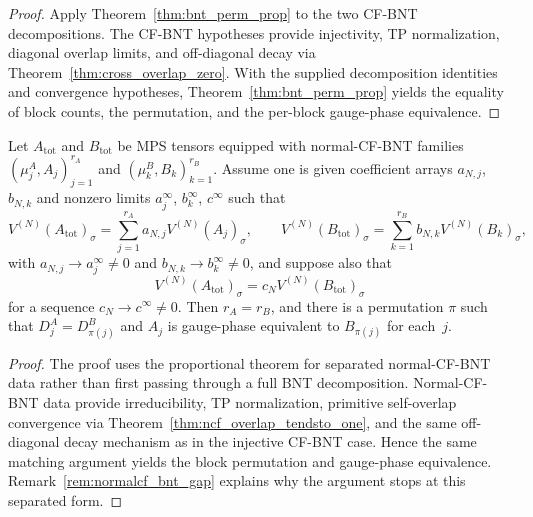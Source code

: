 \begin{proof}
	\leanok
	Apply Theorem~\ref{thm:bnt_perm_prop} to the two CF-BNT
	decompositions.
	The CF-BNT hypotheses provide injectivity, TP normalization,
	diagonal overlap limits, and off-diagonal decay via
	Theorem~\ref{thm:cross_overlap_zero}.
	With the supplied decomposition identities and convergence
	hypotheses, Theorem~\ref{thm:bnt_perm_prop} yields the equality of
	block counts, the permutation, and the per-block gauge-phase
	equivalence.
\end{proof}

\begin{theorem}\label{thm:ft_proportional_nt}
		\leanok
		Let $A_{\mathrm{tot}}$ and $B_{\mathrm{tot}}$ be MPS tensors
		equipped with normal-CF-BNT families $(\mu_j^A, A_j)_{j=1}^{r_A}$ and
		$(\mu_k^B, B_k)_{k=1}^{r_B}$.
		Assume one is given coefficient arrays $a_{N,j}$, $b_{N,k}$ and
		nonzero limits $a_j^\infty$, $b_k^\infty$, $c^\infty$ such that
		\[
			V^{(N)}(A_{\mathrm{tot}})_\sigma
			= \sum_{j=1}^{r_A} a_{N,j} V^{(N)}(A_j)_\sigma,
			\qquad
			V^{(N)}(B_{\mathrm{tot}})_\sigma
			= \sum_{k=1}^{r_B} b_{N,k} V^{(N)}(B_k)_\sigma,
		\]
		with $a_{N,j} \to a_j^\infty \neq 0$ and
		$b_{N,k} \to b_k^\infty \neq 0$, and suppose also that
		\[
			V^{(N)}(A_{\mathrm{tot}})_\sigma
			= c_N V^{(N)}(B_{\mathrm{tot}})_\sigma
		\]
		for a sequence $c_N \to c^\infty \neq 0$.
		Then $r_A = r_B$, and there is a permutation $\pi$ such that
		$D_j^A = D_{\pi(j)}^B$ and $A_j$ is gauge-phase equivalent to
		$B_{\pi(j)}$ for each~$j$.
\end{theorem}

\begin{proof}\leanok
		The proof uses the proportional theorem for separated
		normal-CF-BNT data rather than first passing through a full BNT
		decomposition.
		Normal-CF-BNT data provide irreducibility, TP normalization,
		primitive self-overlap convergence via
		Theorem~\ref{thm:ncf_overlap_tendsto_one}, and the same
		off-diagonal decay mechanism as in the injective CF-BNT case.
		Hence the same matching argument yields the block permutation and
		gauge-phase equivalence.
		Remark~\ref{rem:normalcf_bnt_gap} explains why the argument stops at
		this separated form.
\end{proof}

